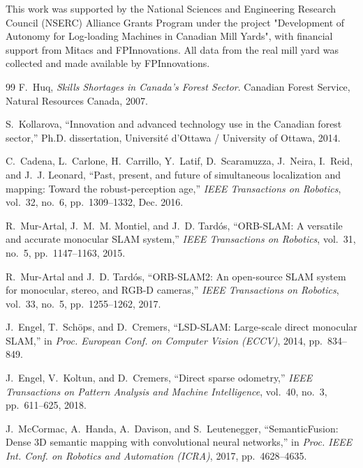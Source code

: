 \documentclass[letterpaper, 10 pt, conference]{IEEEtran}  %
\begin{document}
This work was supported by the National Sciences and
Engineering Research Council (NSERC) Alliance Grants Program under the project "Development of
Autonomy for Log-loading Machines in Canadian Mill Yards", with
financial support from Mitacs and FPInnovations.  All data from the real mill yard was collected and made available by FPInnovations.
\begin{thebibliography}{99}
F.~Huq,
\emph{Skills Shortages in Canada's Forest Sector}.
Canadian Forest Service, Natural Resources Canada, 2007.

S.~Kollarova,
``Innovation and advanced technology use in the Canadian forest sector,''
Ph.D. dissertation, Université d’Ottawa / University of Ottawa, 2014.


C.~Cadena, L.~Carlone, H.~Carrillo, Y.~Latif, D.~Scaramuzza, J.~Neira, I.~Reid, and J.~J. Leonard,
``Past, present, and future of simultaneous localization and mapping: Toward the robust-perception age,''
\emph{IEEE Transactions on Robotics}, vol.~32, no.~6, pp.~1309--1332, Dec. 2016.

R.~Mur-Artal, J.~M.~M. Montiel, and J.~D. Tardós,
``ORB-SLAM: A versatile and accurate monocular SLAM system,''
\emph{IEEE Transactions on Robotics}, vol.~31, no.~5, pp.~1147--1163, 2015.

R.~Mur-Artal and J.~D. Tardós,
``ORB-SLAM2: An open-source SLAM system for monocular, stereo, and RGB-D cameras,''
\emph{IEEE Transactions on Robotics}, vol.~33, no.~5, pp.~1255--1262, 2017.

J.~Engel, T.~Schöps, and D.~Cremers,
``LSD-SLAM: Large-scale direct monocular SLAM,''
in \emph{Proc. European Conf. on Computer Vision (ECCV)}, 2014, pp.~834--849.

J.~Engel, V.~Koltun, and D.~Cremers,
``Direct sparse odometry,''
\emph{IEEE Transactions on Pattern Analysis and Machine Intelligence}, vol.~40, no.~3, pp.~611--625, 2018.

J.~McCormac, A.~Handa, A.~Davison, and S.~Leutenegger,
``SemanticFusion: Dense 3D semantic mapping with convolutional neural networks,''
in \emph{Proc. IEEE Int. Conf. on Robotics and Automation (ICRA)}, 2017, pp.~4628--4635.


\end{thebibliography}
\end{document}
